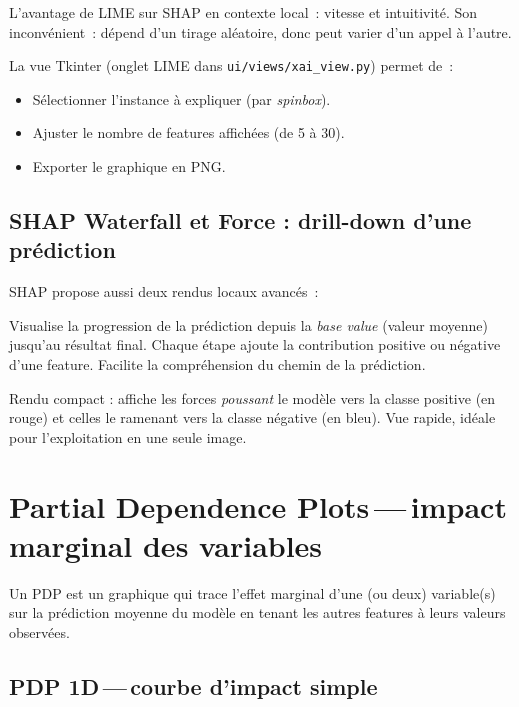 \documentclass[11pt,a4paper]{report}
\begin{document}
L'avantage de LIME sur SHAP en contexte local~: vitesse et
intuitivit\'e. Son inconv\'enient~: d\'epend d'un tirage al\'eatoire,
donc peut varier d'un appel \`a l'autre.

La vue Tkinter (onglet LIME dans \texttt{ui/views/xai\_view.py})
permet de~:
\begin{itemize}
    \item S\'electionner l'instance \`a expliquer (par \textit{spinbox}).
    \item Ajuster le nombre de features affich\'ees (de 5 \`a 30).
    \item Exporter le graphique en PNG.
\end{itemize}

\subsection{SHAP Waterfall et Force : drill-down d'une pr\'ediction}

SHAP propose aussi deux rendus locaux avanc\'es~:

\begin{description}[font=\sffamily\bfseries\color{accent}]
    \item[Waterfall plot]
        Visualise la progression de la pr\'ediction depuis la
        \textit{base value} (valeur moyenne) jusqu'au r\'esultat final.
        Chaque \'etape ajoute la contribution positive ou n\'egative
        d'une feature. Facilite la compr\'ehension du chemin de la
        pr\'ediction.

    \item[Force plot]
        Rendu compact : affiche les forces \textit{poussant} le mod\`ele
        vers la classe positive (en rouge) et celles le ramenant vers
        la classe n\'egative (en bleu). Vue rapide, id\'eale pour
        l'exploitation en une seule image.
\end{description}

\section{Partial Dependence Plots\,---\,impact marginal des variables}

Un PDP est un graphique qui trace l'effet marginal d'une (ou deux)
variable(s) sur la pr\'ediction moyenne du mod\`ele en tenant les
autres features \`a leurs valeurs observ\'ees.

\subsection{PDP 1D\,---\,courbe d'impact simple}
\end{document}
